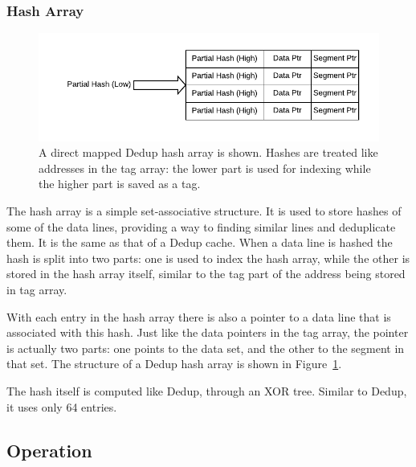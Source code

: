 \subsubsection{Hash Array}
\label{sssec:DedupBDIHash}
\begin{figure}
    \includegraphics[width=\textwidth]{DedupBDI_Hash.pdf}
    \caption[Dedup Hash Array]{A direct mapped Dedup hash array is shown. Hashes are treated like addresses in the tag array: the lower part is used for indexing while the higher part is saved as a tag.}
    \label{fig:DedupBDIHash}
\end{figure}
The hash array is a simple set-associative structure. It is used to store hashes of some of the data lines, providing a way to finding similar lines and deduplicate them. It is the same as that of a Dedup cache. When a data line is hashed the hash is split into two parts: one is used to index the hash array, while the other is stored in the hash array itself, similar to the tag part of the address being stored in tag array.\par
With each entry in the hash array there is also a pointer to a data line that is associated with this hash. Just like the data pointers in the tag array, the pointer is actually two parts: one points to the data set, and the other to the segment in that set. The structure of a Dedup hash array is shown in Figure~\ref{fig:DedupBDIHash}.\par
The hash itself is computed like Dedup, through an XOR tree. Similar to Dedup, it uses only 64 entries.

\subsection{Operation}
\label{ssec:DedupBDIOperations}
